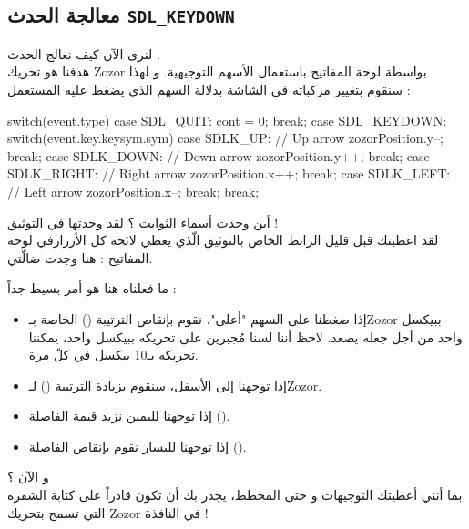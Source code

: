 \subsection{معالجة الحدث \texttt{SDL\_KEYDOWN}}

لنرى الآن كيف نعالج الحدث 
.\\
هدفنا هو تحريك 
\textenglish{Zozor}
بواسطة لوحة المفاتيح باستعمال الأسهم التوجيهية. و لهذا سنقوم بتغيير مركباته في الشاشة بدلالة السهم الذي يضغط عليه المستعمل :

\begin{Csource}
switch(event.type)
{
	case SDL_QUIT:
	cont = 0;
	break;
	case SDL_KEYDOWN:
	switch(event.key.keysym.sym)
	{
		case SDLK_UP: // Up arrow
		zozorPosition.y--;
		break;
		case SDLK_DOWN: // Down arrow
		zozorPosition.y++;
		break;
		case SDLK_RIGHT: // Right arrow
		zozorPosition.x++;
		break;
		case SDLK_LEFT: // Left arrow
		zozorPosition.x--;
		break;
	}
	break;
}
\end{Csource}

أين وجدت أسماء الثوابت ؟  لقد وجدتها في التوثيق !\\
لقد اعطيتك قبل قليل الرابط الخاص بالتوثيق الّذي يعطي لائحة كل الأزرارفي لوحة المفاتيح : هنا وجدت ضالّتي. 

ما فعلناه هنا هو أمر بسيط جداً :

\begin{itemize}
	\item إذا ضغطنا على السهم "أعلى"، نقوم بإنقاص الترتيبة 
	()
	الخاصة بـ\textenglish{Zozor}
	ببيكسل واحد من أجل جعله يصعد. لاحظ أننا لسنا مُجبرين على تحريكه ببيكسل واحد، يمكننا تحريكه بـ10 بيكسل في كلّ مرة.
	\item إذا توجهنا إلى الأسفل، سنقوم بزيادة الترتيبة
	()
	لـ\textenglish{Zozor}.
	\item إذا توجهنا لليمين نزيد قيمة الفاصلة 
	().
	\item إذا توجهنا لليسار نقوم بإنقاص الفاصلة  
	().
\end{itemize}

و الآن ؟\\
بما أنني أعطيتك التوجيهات و حتى المخطط، يجدر بك أن تكون قادراً على كتابة الشفرة التي تسمح بتحريك
\textenglish{Zozor}
في النافذة !

